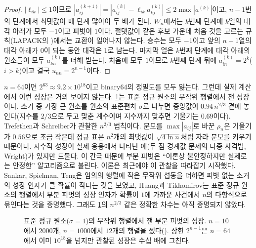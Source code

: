 \begin{proof}
$|\ell_{ik}|\le1$이므로 $|a^{(k+1)}_{ij}|=|a^{(k)}_{ij}-\ell_{ik}a^{(k)}_{kj}|\le2\max|a^{(k)}|$이고, $n-1$번의 단계에서 최댓값이 매 단계 많아야 두 배가 된다. $W_n$에서는 $k$번째 단계에 $k$열의 대각 아래가 모두 $-1$이고 피벗이 $1$이다. 절댓값이 같은 후보 가운데 처음 것을 고르는 규칙(LAPACK의 )에서는 교환이 일어나지 않는다. 승수는 모두 $-1$이고 앞의 $n-1$열의 대각 아래가 $0$이 되는 동안 대각은 $1$로 남는다. 마지막 열은 $k$번째 단계에 대각 아래의 원소들이 모두 $a_{kn}^{(k)}$를 더해 받는다. 처음에 모두 $1$이므로 $k$번째 단계 뒤에 $a^{(k)}_{in}=2^{k}$($i>k$)이고 결국 $u_{nn}=2^{n-1}$이다.
\end{proof}

$n=64$이면 $2^{63}\approx9.2\times10^{18}$이고 binary64의 정밀도를 모두 잃는다. 그런데 실제 계산에서 이런 성장은 거의 보이지 않는다. \cref{fig:lu-growth}는 표준 정규 원소의 무작위 행렬에서 잰 성장이다. 소거 중 가장 큰 원소를 원소의 표준편차 $\sigma$로 나누면 중앙값이 $0.94\,n^{2/3}$ 곁에 놓인다(지수를 $2/3$으로 두고 맞춘 계수이며 지수까지 맞추면 기울기는 $0.69$이다). Trefethen과 Schreiber가 관찰한 $n^{2/3}$ 법칙이다\cite{trefethen1990average}. 분모를 $\max|a_{ij}|$로 바꾼 $\rho_n$은 기울기가 $0.56$으로 조금 작은데 정규 표본 $n^2$개의 최댓값이 $\sqrt{4\ln n}$처럼 자라 분모를 키우기 때문이다. 지수적 성장이 실제 응용에서 나타난 예(두 점 경계값 문제의 다중 사격법, Wright\cite{wright1993})가 있지만 드물다. 이 간극 때문에 부분 피벗은 ``이론상 불안정하지만 실제로는 안정한'' 알고리즘으로 불린다. 이론은 최근에야 이 관찰을 따라잡기 시작했다. Sankar, Spielman, Teng은 임의의 행렬에 작은 무작위 섭동을 더하면 피벗 없는 소거의 성장 인자가 클 확률이 작다는 것을 보였고\cite{sankar2006smoothed}, Huang과 Tikhomirov는 표준 정규 원소의 행렬에서 부분 피벗의 성장 인자가 확률이 $1$에 가까운 사건에서 $n$의 다항식으로 묶인다는 것을 증명했다\cite{huang2024average}. 그래도 \cref{fig:lu-growth}의 $n^{2/3}$ 같은 정확한 차수는 아직 증명되지 않았다.

\begin{figure}[htbp]
\centering
{}
\caption{표준 정규 원소($\sigma=1$)의 무작위 행렬에서 잰 부분 피벗의 성장. $n=10$에서 $2000$개, $n=1000$에서 $12$개의 행렬을 썼다(). 상한 $2^{n-1}$은 $n=64$에서 이미 $10^{18}$을 넘지만 관찰된 성장은 수십 배에 그친다.}
\label{fig:lu-growth}
\end{figure}

